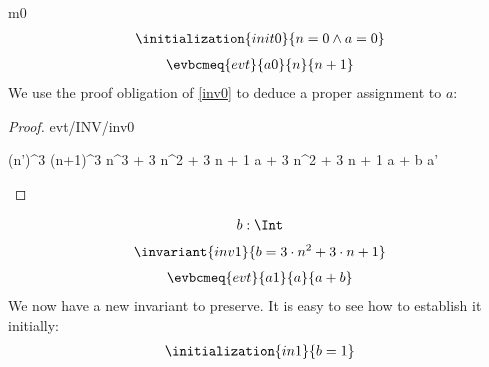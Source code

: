 \documentclass[12pt]{amsart}
\begin{document}
\begin{machine}{m0}
%
\begin{align*}
\initialization{init0}
{	n = 0 \land a = 0	}
\end{align*}
\begin{align*}
\evbcmeq{evt}{a0}
	{n}{n + 1}
\end{align*}
%
We use the proof obligation of \ref{inv0} to deduce a proper assignment to $a$:
%
\begin{proof}{evt/INV/inv0}
	\begin{calculation}
		(n')^3
	\hint{=}{ \ref{a0} }
		(n+1)^3
		n^3 + 3 \cdot n^2 + 3 \cdot n + 1
	\hint{=}{ \ref{inv0} }
		a + 3 \cdot n^2 + 3 \cdot n + 1
		a + b
	\hint{=}{ \ref{a1} }
		a'
	\end{calculation}
\end{proof}
%
\begin{align*}
\variable{	b : \Int}
\end{align*}
%
\begin{align*}
\invariant{inv1}
{	b = 3 \cdot n^2 + 3 \cdot n + 1	}
\end{align*}
\begin{align*}
\evbcmeq{evt}{a1}
	{a}{ a + b }
\end{align*}
%
We now have a new invariant to preserve. It is easy to see how to establish it initially:
\begin{align*}
\initialization{in1}
{	b = 1	}
\end{align*}
%
%
%	
%

\end{machine}
\end{document}
